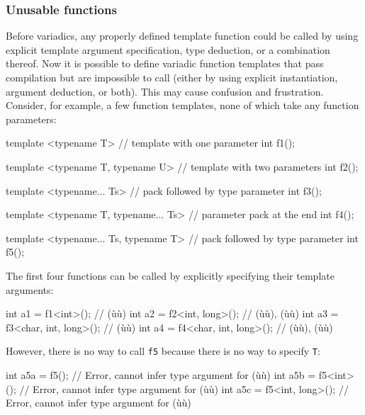 \subsubsection[Unusable functions]{Unusable functions}\label{unusable-functions}

Before variadics, any properly defined template function could be called
by using explicit template argument specification, type deduction, or a
combination thereof. Now it is possible to define variadic function
templates that pass compilation but are impossible to call (either by
using explicit instantiation, argument deduction, or both). This may
cause confusion and frustration. Consider, for example, a few function
templates, none of which take any function parameters:

\begin{emcppslisting}[emcppsbatch=e42]
template <typename T>                  // template with one parameter
int f1();

template <typename T, typename U>      // template with two parameters
int f2();

template <typename... Ts>              // pack followed by type parameter
int f3();

template <typename T, typename... Ts>  // parameter pack at the end
int f4();

template <typename... Ts, typename T>  // pack followed by type parameter
int f5();
\end{emcppslisting}
    

\noindent The first four functions can be called by explicitly specifying their
template arguments:

\begin{emcppslisting}[emcppsbatch=e42]
int a1 = f1<int>();              // (ù{}ù)
int a2 = f2<int, long>();        // (ù{}ù), (ù{}ù)
int a3 = f3<char, int, long>();  // (ù{}ù)
int a4 = f4<char, int, long>();  // (ù{}ù), (ù{}ù)
\end{emcppslisting}
    

\noindent However, there is no way to call \lstinline!f5! because there is no way to
specify \lstinline!T!:

\begin{emcppslisting}
int a5a = f5();             // Error, cannot infer type argument for (ù{}ù)
int a5b = f5<int>();        // Error, cannot infer type argument for (ù{}ù)
int a5c = f5<int, long>();  // Error, cannot infer type argument for (ù{}ù)
\end{emcppslisting}
    


